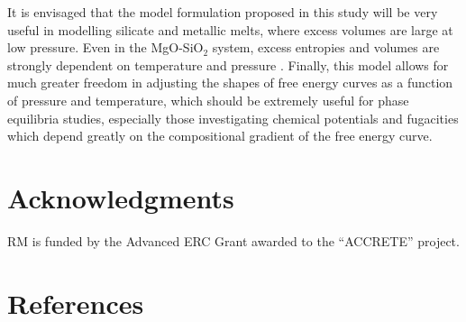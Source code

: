 \documentclass[review]{elsarticle}
\begin{document}
It is envisaged that the model formulation proposed in this study will be very useful in modelling silicate and metallic melts, where excess volumes are large at low pressure. Even in the MgO-SiO$_2$ system, excess entropies and volumes are strongly dependent on temperature and pressure \citep{DKS2013}. Finally, this model allows for much greater freedom in adjusting the shapes of free energy curves as a function of pressure and temperature, which should be extremely useful for phase equilibria studies, especially those investigating chemical potentials and fugacities which depend greatly on the compositional gradient of the free energy curve.


\section{Acknowledgments}
RM is funded by the Advanced ERC Grant awarded to the ``ACCRETE'' project.
\clearpage
\section*{References}


\end{document}

